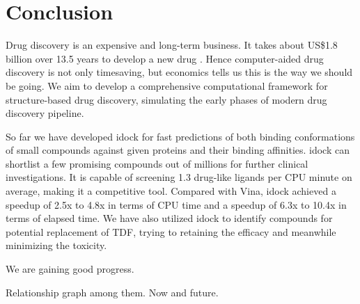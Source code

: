 \chapter{Conclusion}

Drug discovery is an expensive and long-term business. It takes about US\$1.8 billion over 13.5 years to develop a new drug \citep{716}. Hence computer-aided drug discovery is not only timesaving, but economics tells us this is the way we should be going. We aim to develop a comprehensive computational framework for structure-based drug discovery, simulating the early phases of modern drug discovery pipeline.

So far we have developed idock for fast predictions of both binding conformations of small compounds against given proteins and their binding affinities. idock can shortlist a few promising compounds out of millions for further clinical investigations. It is capable of screening 1.3 drug-like ligands per CPU minute on average, making it a competitive tool. Compared with Vina, idock achieved a speedup of 2.5x to 4.8x in terms of CPU time and a speedup of 6.3x to 10.4x in terms of elapsed time. We have also utilized idock to identify compounds for potential replacement of TDF, trying to retaining the efficacy and meanwhile minimizing the toxicity.

We are gaining good progress.

Relationship graph among them. Now and future.

\chapterend

